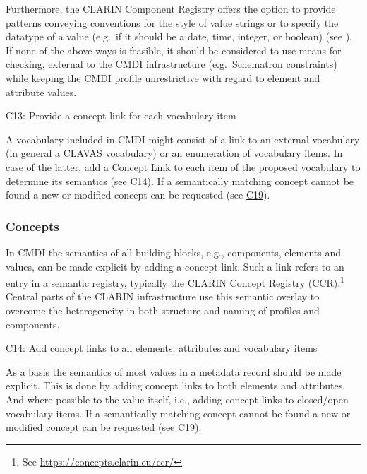 Furthermore, the CLARIN Component Registry offers the option to provide patterns conveying conventions for the style of value strings or to specify the datatype of a value (e.g.~if it should be a date, time, integer, or boolean) (see ). If none of the above ways is feasible, it should be considered to use means for checking, external to the CMDI infrastructure (e.g.~Schematron constraints) while keeping the CMDI profile unrestrictive with regard to element and attribute values.

C13: Provide a concept link for each vocabulary item

 

A vocabulary included in CMDI might consist of a link to an external vocabulary (in general a CLAVAS vocabulary) or an enumeration of vocabulary items. In case of the latter, add a Concept Link to each item of the proposed vocabulary to determine its semantics (see
\hyperref[c14]{C14}). If a semantically matching concept cannot be found a new or modified concept can be requested (see \hyperref[c19]{C19}).

\subsubsection{Concepts}\label{concepts}


In CMDI the semantics of all building blocks, e.g., components, elements and values, can be made explicit by adding a concept link. Such a link refers to an entry in a semantic registry, typically the CLARIN Concept Registry (CCR).\footnote{See \url{https://concepts.clarin.eu/ccr/}}
Central parts of the CLARIN infrastructure use this semantic overlay to overcome the heterogeneity in both structure and naming of profiles and components.

\label{c14}
C14: Add concept links to all elements, attributes and vocabulary items

 

As a basis the semantics of most values in a metadata record should be made explicit. This is done by adding concept links to both elements and attributes. And where possible to the value itself, i.e., adding concept links to closed/open vocabulary items. If a semantically matching concept cannot be found a new or modified concept can be requested (see
\hyperref[c19]{C19}).

